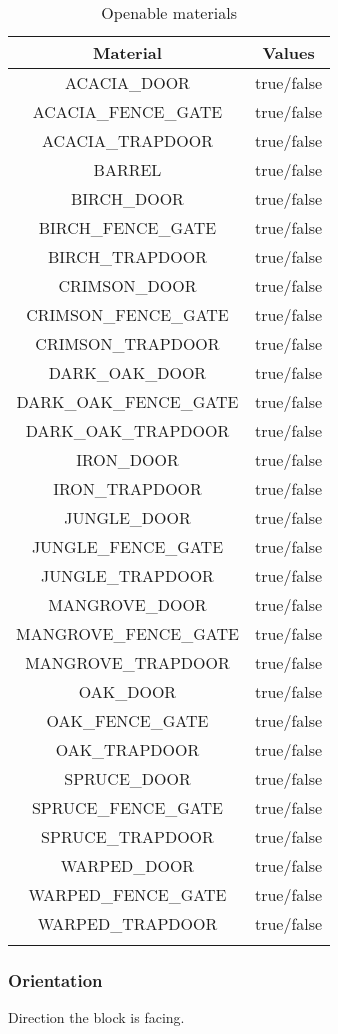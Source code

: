 \begin{longtable}{ |c|c| }
	\hline
	Material & Values \\
	\hline
	\endhead
	ACACIA\_DOOR & true/false \\
	ACACIA\_FENCE\_GATE & true/false \\
	ACACIA\_TRAPDOOR & true/false \\
	BARREL & true/false \\
	BIRCH\_DOOR & true/false \\
	BIRCH\_FENCE\_GATE & true/false \\
	BIRCH\_TRAPDOOR & true/false \\
	CRIMSON\_DOOR & true/false \\
	CRIMSON\_FENCE\_GATE & true/false \\
	CRIMSON\_TRAPDOOR & true/false \\
	DARK\_OAK\_DOOR & true/false \\
	DARK\_OAK\_FENCE\_GATE & true/false \\
	DARK\_OAK\_TRAPDOOR & true/false \\
	IRON\_DOOR & true/false \\
	IRON\_TRAPDOOR & true/false \\
	JUNGLE\_DOOR & true/false \\
	JUNGLE\_FENCE\_GATE & true/false \\
	JUNGLE\_TRAPDOOR & true/false \\
	MANGROVE\_DOOR & true/false \\
	MANGROVE\_FENCE\_GATE & true/false \\
	MANGROVE\_TRAPDOOR & true/false \\
	OAK\_DOOR & true/false \\
	OAK\_FENCE\_GATE & true/false \\
	OAK\_TRAPDOOR & true/false \\
	SPRUCE\_DOOR & true/false \\
	SPRUCE\_FENCE\_GATE & true/false \\
	SPRUCE\_TRAPDOOR & true/false \\
	WARPED\_DOOR & true/false \\
	WARPED\_FENCE\_GATE & true/false \\
	WARPED\_TRAPDOOR & true/false \\
	\hline
	\caption{Openable materials}
\end{longtable}

\subsubsection{Orientation}
Direction the block is facing.

